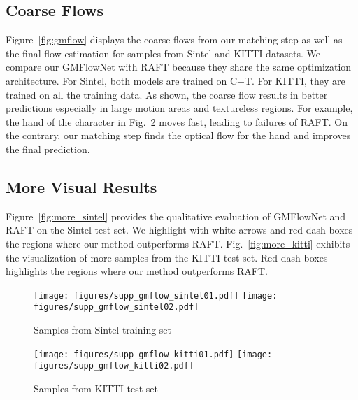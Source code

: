 \documentclass[10pt,twocolumn,letterpaper]{article}
\begin{document}
\subsection{Coarse Flows}

Figure~\ref{fig:gmflow} displays the coarse flows from our matching step as well as the final flow estimation for samples from Sintel \cite{butler2012naturalistic} and KITTI \cite{menze2015object} datasets. 
We compare our GMFlowNet with RAFT \cite{teed2020raft} because they share the same optimization architecture. 
For Sintel, both models are trained on C+T. 
For KITTI, they are trained on all the training data. 
As shown, the coarse flow results in better predictions especially in large motion areas and textureless regions. For example, the hand of the character in Fig.~\ref{fig:kitti_gmflow} moves fast, leading to failures of RAFT. On the contrary, our matching step finds the optical flow for the hand and improves the final prediction.


\subsection{More Visual Results}

Figure~\ref{fig:more_sintel} provides the qualitative evaluation of GMFlowNet and RAFT on the Sintel test set. We highlight with white arrows and red dash boxes the regions where our method outperforms RAFT.
Fig.~\ref{fig:more_kitti} exhibits the visualization of more samples from the KITTI test set. Red dash boxes highlights the regions where our method outperforms RAFT. 


\begin{figure*}
  \centering
  \begin{subfigure}{1\linewidth}
      \texttt{[image: figures/supp\_gmflow\_sintel01.pdf]}
      \texttt{[image: figures/supp\_gmflow\_sintel02.pdf]}
      \caption{Samples from Sintel training set \cite{butler2012naturalistic}}
      \label{fig:sintel_gmflow}
  \end{subfigure}
  \begin{subfigure}{1\linewidth}
      \texttt{[image: figures/supp\_gmflow\_kitti01.pdf]}
      \texttt{[image: figures/supp\_gmflow\_kitti02.pdf]}
      \caption{Samples from KITTI test set \cite{menze2015object}}
      \label{fig:kitti_gmflow}
  \end{subfigure}
  \caption{{\bf Visualizations of coarse flow.} For (a) Sintel, models are trained on C+T. For (b) KITTI, models are trained on C+T+S+K+H. Ground-truth flows for KITTI are unavailable and thus are not shown. 
  With the coarse flow, our method outperforms the most popular optimization-only method RAFT \cite{teed2020raft}. Red dash boxes highlight the main differences between RAFT's predictions and ours.
  }  \label{fig:gmflow}
\end{figure*}
\end{document}

